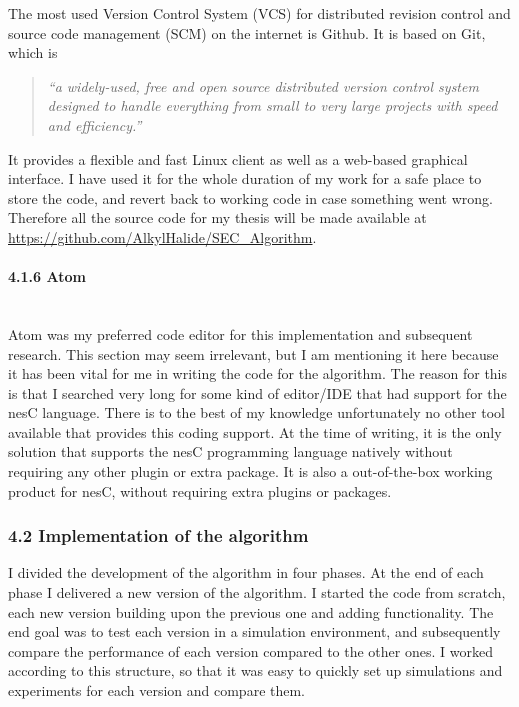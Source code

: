 The most used Version Control System (VCS) for distributed revision
control and source code management (SCM) on the internet is Github. It
is based on Git, which is

\begin{quote}
\emph{``a widely-used, free and open source distributed version control
system designed to handle everything from small to very large projects
with speed and efficiency\cite{github}.''}
\end{quote}

It provides a flexible and fast Linux client as well as a web-based
graphical interface. I have used it for the whole duration of my work
for a safe place to store the code, and revert back to working code in
case something went wrong. Therefore all the source code for my thesis
will be made available at
\url{https://github.com/AlkylHalide/SEC_Algorithm}.

\paragraph{4.1.6 Atom\\\\}\label{atom}

Atom was my preferred code editor for this implementation and subsequent
research. This section may seem irrelevant, but I am mentioning it here
because it has been vital for me in writing the code for the algorithm.
The reason for this is that I searched very long for some kind of
editor/IDE that had support for the nesC language. There is to the best
of my knowledge unfortunately no other tool available that provides this
coding support. At the time of writing, it is the only solution that
supports the nesC programming language natively without requiring any
other plugin or extra package. It is also a out-of-the-box working
product for nesC, without requiring extra plugins or
packages\cite{atom}.

\subsubsection{4.2 Implementation of the
algorithm}\label{implementation-of-the-algorithm}

I divided the development of the algorithm in four phases. At the end of
each phase I delivered a new version of the algorithm. I started the
code from scratch, each new version building upon the previous one and
adding functionality. The end goal was to test each version in a
simulation environment, and subsequently compare the performance of each
version compared to the other ones. I worked according to this
structure, so that it was easy to quickly set up simulations and
experiments for each version and compare them.

